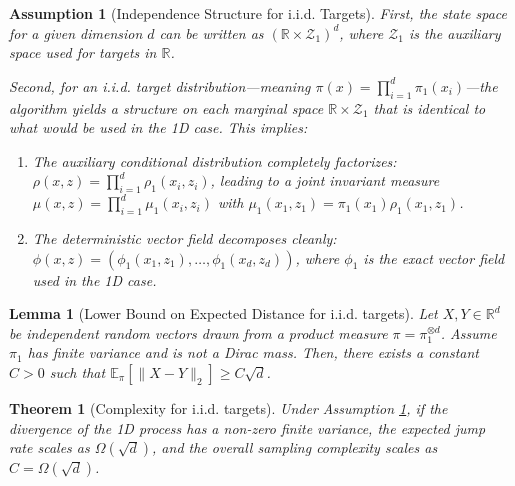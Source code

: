 \documentclass[10pt,a4paper]{amsart}
\newtheorem{assumption}{Assumption}
\newtheorem{lemma}{Lemma}
\newtheorem{theorem}{Theorem}
\begin{document}
\begin{assumption}[Independence Structure for i.i.d. Targets]
    \label{assum:independence_structure}
    First, the state space for a given dimension $d$ can be written as $(\mathbb{R} \times \mathcal{Z}_1)^d$, where $\mathcal{Z}_1$ is the auxiliary space used for targets in $\mathbb{R}$. 
    
    Second, for an i.i.d. target distribution---meaning $\pi(x) = \prod_{i=1}^d \pi_1(x_i)$---the algorithm yields a structure on each marginal space $\mathbb{R} \times \mathcal{Z}_1$ that is identical to what would be used in the 1D case. This implies:
    \begin{enumerate}
        \item The auxiliary conditional distribution completely factorizes: $\rho(x,z) = \prod_{i=1}^d \rho_1(x_i,z_i)$, leading to a joint invariant measure $\mu(x,z) = \prod_{i=1}^d \mu_1(x_i,z_i)$ with $\mu_1(x_1,z_1) = \pi_1(x_1) \rho_1(x_1,z_1)$.
        \item The deterministic vector field decomposes cleanly: $\phi(x,z) = (\phi_1(x_1,z_1), \dots, \phi_1(x_d,z_d))$, where $\phi_1$ is the exact vector field used in the 1D case.
    \end{enumerate}
\end{assumption}

\begin{lemma}[Lower Bound on Expected Distance for i.i.d. targets]
    \label{lem:distance_lower}
    Let $X, Y \in \mathbb{R}^d$ be independent random vectors drawn from a product measure $\pi = \pi_1^{\otimes d}$. Assume $\pi_1$ has finite variance and is not a Dirac mass. Then, there exists a constant $C > 0$ such that $\mathbb{E}_\pi[\|X - Y\|_2] \ge C \sqrt{d}$.
\end{lemma}

\begin{theorem}[Complexity for i.i.d. targets]
    \label{th:complexity}
    Under Assumption \ref{assum:independence_structure}, if the divergence of the 1D process has a non-zero finite variance, the expected jump rate scales as $\Omega(\sqrt{d})$, and the overall sampling complexity scales as $C = \Omega(\sqrt{d})$.
\end{theorem}
\end{document}
